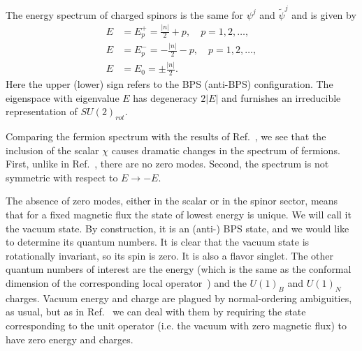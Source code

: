 \documentclass[a4paper,12pt, amsfonts, amssymb]{article}
\newcommand{\ra}{\rightarrow}
\newcommand{\tpsi}{{\tilde \psi}}
\begin{document}
The energy spectrum of charged spinors is the same for $\psi^j$ and $\tpsi^j$
and is given by
\begin{align*}
E&=E_p^+=\frac{|n|}{2}+p,\quad p=1,2,\ldots,\\
E&=E_p^-=-\frac{|n|}{2}-p,\quad p=1,2,\ldots,\\
E&=E_0=\pm \frac{|n|}{2}.
\end{align*}
Here the upper (lower) sign refers to the BPS (anti-BPS) configuration. 
The eigenspace with eigenvalue $E$ has degeneracy $2|E|$ and furnishes
an irreducible representation of $SU(2)_{rot}$.

Comparing the fermion spectrum with the results of Ref.~\cite{BKWone}, we see
that the inclusion of the scalar $\chi$ causes dramatic changes in the spectrum of fermions. First, unlike in Ref.~\cite{BKWone}, there are no zero modes. 
Second, the spectrum is not symmetric with respect to $E\ra -E$.

The absence of zero modes, either in the scalar or in the spinor sector,
means that for a fixed magnetic flux the state of lowest energy is unique. 
We will call it the vacuum state. By construction, it is an (anti-) BPS state, 
and we would like to determine its quantum numbers. It is clear that the vacuum
state is rotationally invariant, so its spin is zero. It is also
a flavor singlet. The other quantum numbers
of interest are the energy (which is the same as the conformal dimension of
the corresponding local operator~\cite{BKWone}) and the $U(1)_B$ and 
$U(1)_N$ charges.
Vacuum energy and charge are plagued by normal-ordering ambiguities,
as usual, but as in Ref.~\cite{BKWone} we can deal with them by requiring the
state corresponding to the unit operator (i.e. the vacuum with zero magnetic
flux) to have zero energy and charges. 
\end{document}
